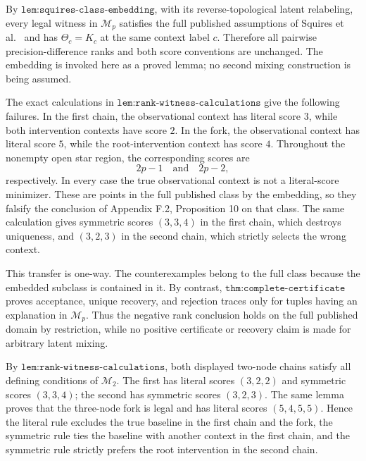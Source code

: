 By \(\texttt{lem:squires-class-embedding}\), with its reverse-topological
latent relabeling, every legal witness in \(\mathcal M_p\) satisfies the
full published assumptions of Squires
et al.~\cite[Assumption 1 and Appendix F.2, Proposition 10]{pmlr-v202-squires23a}
and has
\(\Theta_c=K_c\) at the same context label \(c\).  Therefore all
pairwise precision-difference ranks and both score conventions are
unchanged.  The embedding is invoked here as a proved lemma; no second
mixing construction is being assumed.

The exact calculations in \(\texttt{lem:rank-witness-calculations}\)
give the following failures.  In the first chain, the observational
context has literal score \(3\), while both intervention contexts have
score \(2\).  In the fork, the observational context has literal score
\(5\), while the root-intervention context has score \(4\).  Throughout
the nonempty open star region, the corresponding scores are
\[
 2p-1\quad\text{and}\quad 2p-2,
\]
respectively.  In every case the true observational context is not a
literal-score minimizer.  These are points in the full published class by
the embedding, so they falsify the conclusion of Appendix F.2,
Proposition 10 on that class.  The same calculation gives symmetric scores
\((3,3,4)\) in the first chain, which destroys uniqueness, and
\((3,2,3)\) in the second chain, which strictly selects the wrong
context.

This transfer is one-way.  The counterexamples belong to the full class
because the embedded subclass is contained in it.  By contrast,
\(\texttt{thm:complete-certificate}\) proves acceptance, unique recovery,
and rejection traces only for tuples having an explanation in
\(\mathcal M_p\).  Thus the negative rank conclusion holds on the full
published domain by restriction, while no positive certificate or
recovery claim is made for arbitrary latent mixing.

By \(\texttt{lem:rank-witness-calculations}\), both displayed two-node
chains satisfy all defining conditions of \(\mathcal M_2\).  The first
has literal scores \((3,2,2)\) and symmetric scores \((3,3,4)\); the
second has symmetric scores \((3,2,3)\).  The same lemma proves that the
three-node fork is legal and has literal scores \((5,4,5,5)\).  Hence the
literal rule excludes the true baseline in the first chain and the fork,
the symmetric rule ties the baseline with another context in the first
chain, and the symmetric rule strictly prefers the root intervention in
the second chain.

